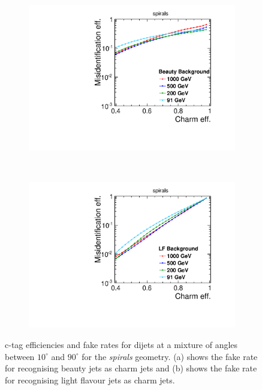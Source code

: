 \begin{figure}[H]
        \begin{subfigure}[b]{0.5\textwidth}
          \centering
          \includegraphics[width=\textwidth]{Figures/ImpactOfGeometries/Global_energies_CLIC_SiD_spirals_Charm_Beauty_.pdf}
          \caption{}
          \label{}
        \end{subfigure}%
        ~ 
        \begin{subfigure}[b]{0.5\textwidth}
          \centering
          \includegraphics[width=\textwidth]{Figures/ImpactOfGeometries/Global_energies_CLIC_SiD_spirals_Charm_LF_.pdf}
          \caption{}
          \label{}
        \end{subfigure}
        \caption{c-tag efficiencies and fake rates for dijets at a mixture of angles between $10^{\circ}$ and
          $90^{\circ}$ for the \textit{spirals} geometry. (a) shows the fake rate for recognising beauty jets as charm jets and (b) shows the fake rate for recognising light flavour jets as charm jets.}\label{fig:FTEnergyDependenceC}
\end{figure}

